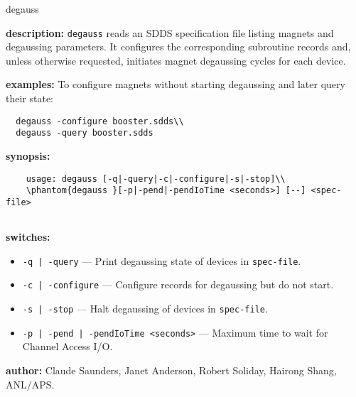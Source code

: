 \begin{sddsprog}{degauss}
\item \textbf{description:}
\verb+degauss+ reads an SDDS specification file listing magnets and degaussing parameters.
It configures the corresponding subroutine records and, unless otherwise requested, initiates
magnet degaussing cycles for each device.
\item \textbf{examples:}
To configure magnets without starting degaussing and later query their state:
\begin{verbatim}
  degauss -configure booster.sdds\\
  degauss -query booster.sdds
\end{verbatim}
\item \textbf{synopsis:}
  \begin{verbatim}
    usage: degauss [-q|-query|-c|-configure|-s|-stop]\\
    \phantom{degauss }[-p|-pend|-pendIoTime <seconds>] [--] <spec-file>
  
\end{verbatim}
\item \textbf{switches:}
\begin{itemize}
  \item {\tt -q\,|\,-query} --- Print degaussing state of devices in {\tt spec-file}.
  \item {\tt -c\,|\,-configure} --- Configure records for degaussing but do not start.
  \item {\tt -s\,|\,-stop} --- Halt degaussing of devices in {\tt spec-file}.
  \item {\tt -p\,|\,-pend\,|\,-pendIoTime <seconds>} --- Maximum time to wait for Channel Access I/O.
\end{itemize}
\item \textbf{author:} Claude Saunders, Janet Anderson, Robert Soliday, Hairong Shang, ANL/APS.
\end{sddsprog}
